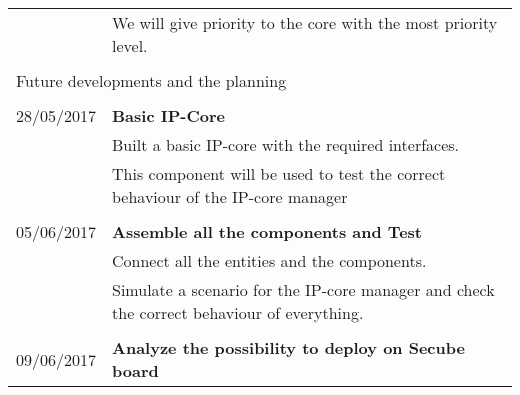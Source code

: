 \begin{table}[h]
\begin{tabular}{p{2.1cm}|  p{13.5cm}}
		& We will give priority to the core with the most priority level.
		\multicolumn{2}{p{1.0cm}}{ \Large{{ }}}\\
			\multicolumn{2}{p{1.0cm}}{ \Large{{ }}}
				\multicolumn{2}{p{1.0cm}}{ \Large{{ }}}\\
	\multicolumn{2}{p{10.0cm}}{ \LARGE{{Future developments and the planning}}}\\
	\hline \hline 
	\multicolumn{2}{p{1.0cm}}{ \Large{{}}}\\
	28/05/2017 & \textbf{Basic IP-Core}\\
	& Built a basic IP-core with the required interfaces.\\
	& This component will be used to test the correct behaviour of the IP-core manager\\
	\multicolumn{2}{p{1.0cm}}{ \Large{{ }}}\\		
	05/06/2017 & \textbf{Assemble all the components and Test}\\
	& Connect all the entities and the components.\\
	& Simulate a scenario for the IP-core manager and check the correct behaviour of everything.
	\\ \multicolumn{2}{p{1.0cm}}{ \Large{{ }}}\\	
		09/06/2017 & \textbf{Analyze the possibility to deploy on Secube board}\\
\end{tabular}
\end{table}	